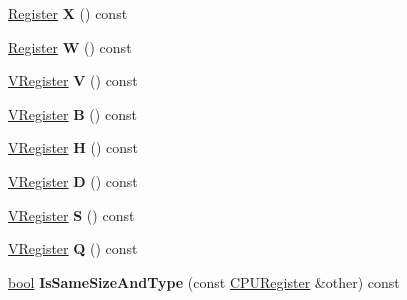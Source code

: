\begin{DoxyCompactItemize}
\mbox{\label{classv8_1_1internal_1_1CPURegister_a1749512c6c7d303f8c5f10fcd46232a5}} 
\mbox{\hyperlink{classv8_1_1internal_1_1Register}{Register}} {\bfseries X} () const
\item 
\mbox{\label{classv8_1_1internal_1_1CPURegister_a449e54e63d03500d8ffb0c450e55c73a}} 
\mbox{\hyperlink{classv8_1_1internal_1_1Register}{Register}} {\bfseries W} () const
\item 
\mbox{\label{classv8_1_1internal_1_1CPURegister_affd8ff6fa47de22b65e0173ed09b81e0}} 
\mbox{\hyperlink{classv8_1_1internal_1_1VRegister}{V\+Register}} {\bfseries V} () const
\item 
\mbox{\label{classv8_1_1internal_1_1CPURegister_ab1931d4f9f169aca79e31ecc257c097b}} 
\mbox{\hyperlink{classv8_1_1internal_1_1VRegister}{V\+Register}} {\bfseries B} () const
\item 
\mbox{\label{classv8_1_1internal_1_1CPURegister_a924e5f79cc7ef497e594598387ec7a8a}} 
\mbox{\hyperlink{classv8_1_1internal_1_1VRegister}{V\+Register}} {\bfseries H} () const
\item 
\mbox{\label{classv8_1_1internal_1_1CPURegister_ab5401849c41d3ddf4be335d2a5d5fc65}} 
\mbox{\hyperlink{classv8_1_1internal_1_1VRegister}{V\+Register}} {\bfseries D} () const
\item 
\mbox{\label{classv8_1_1internal_1_1CPURegister_a3cf5831a4c12d0db36fc26390948d17e}} 
\mbox{\hyperlink{classv8_1_1internal_1_1VRegister}{V\+Register}} {\bfseries S} () const
\item 
\mbox{\label{classv8_1_1internal_1_1CPURegister_a0404ae6739806c72d641549f3f0afbde}} 
\mbox{\hyperlink{classv8_1_1internal_1_1VRegister}{V\+Register}} {\bfseries Q} () const
\item 
\mbox{\label{classv8_1_1internal_1_1CPURegister_ada7a10cc36ab92f2f48554dfb4538573}} 
\mbox{\hyperlink{classbool}{bool}} {\bfseries Is\+Same\+Size\+And\+Type} (const \mbox{\hyperlink{classv8_1_1internal_1_1CPURegister}{C\+P\+U\+Register}} \&other) const

\end{DoxyCompactItemize}
